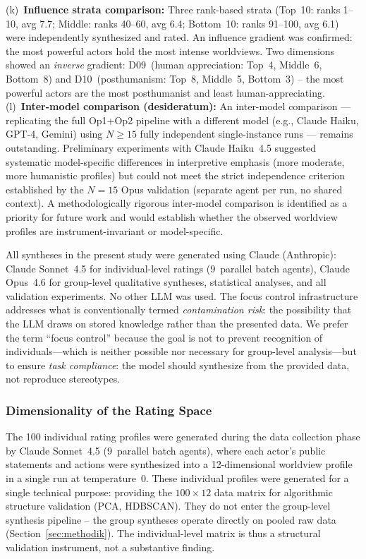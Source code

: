 \documentclass[12pt,a4paper]{article}
\begin{document}
(k)~\textbf{Influence strata comparison:} Three rank-based strata (Top~10: ranks 1--10, avg 7.7; Middle: ranks 40--60, avg 6.4; Bottom~10: ranks 91--100, avg 6.1) were independently synthesized and rated. An influence gradient was confirmed: the most powerful actors hold the most intense worldviews. Two dimensions showed an \emph{inverse} gradient: D09~(human appreciation: Top~4, Middle~6, Bottom~8) and D10~(posthumanism: Top~8, Middle~5, Bottom~3) -- the most powerful actors are the most posthumanist and least human-appreciating.
(l)~\textbf{Inter-model comparison (desideratum):} An inter-model comparison --- replicating the full Op1+Op2 pipeline with a different model (e.g., Claude Haiku, GPT-4, Gemini) using $N \geq 15$ fully independent single-instance runs --- remains outstanding. Preliminary experiments with Claude Haiku~4.5 suggested systematic model-specific differences in interpretive emphasis (more moderate, more humanistic profiles) but could not meet the strict independence criterion established by the $N = 15$ Opus validation (separate agent per run, no shared context). A methodologically rigorous inter-model comparison is identified as a priority for future work and would establish whether the observed worldview profiles are instrument-invariant or model-specific.

All syntheses in the present study were generated using Claude (Anthropic): Claude Sonnet~4.5 for individual-level ratings (9~parallel batch agents), Claude Opus~4.6 for group-level qualitative syntheses, statistical analyses, and all validation experiments. No other LLM was used. The focus control infrastructure addresses what is conventionally termed \emph{contamination risk}: the possibility that the LLM draws on stored knowledge rather than the presented data. We prefer the term ``focus control'' because the goal is not to prevent recognition of individuals---which is neither possible nor necessary for group-level analysis---but to ensure \emph{task compliance}: the model should synthesize from the provided data, not reproduce stereotypes.


\subsubsection{Dimensionality of the Rating Space}

The 100 individual rating profiles were generated during the data collection phase by Claude Sonnet~4.5 (9~parallel batch agents), where each actor's public statements and actions were synthesized into a 12-dimensional worldview profile in a single run at temperature~0. These individual profiles were generated for a single technical purpose: providing the $100 \times 12$ data matrix for algorithmic structure validation (PCA, HDBSCAN). They do not enter the group-level synthesis pipeline -- the group syntheses operate directly on pooled raw data (Section~\ref{sec:methodik}). The individual-level matrix is thus a structural validation instrument, not a substantive finding.
\end{document}
